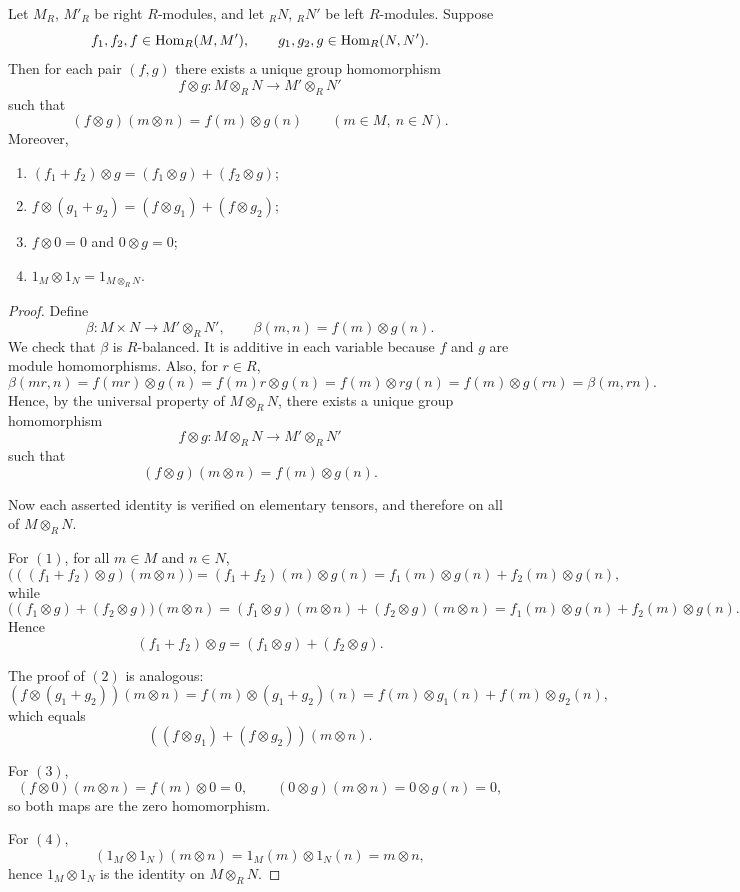 \begin{lemma}
    Let $M_R$, $M'_R$ be right $R$-modules, and let ${}_R N$, ${}_R N'$ be left $R$-modules. Suppose
    \[
        f_1,f_2,f\in \mathrm{Hom}_R(M,M'),
        \qquad
        g_1,g_2,g\in \mathrm{Hom}_R(N,N').
    \]
    Then for each pair $(f,g)$ there exists a unique group homomorphism
    \[
        f\otimes g:M\otimes_R N\to M'\otimes_R N'
    \]
    such that
    \[
        (f\otimes g)(m\otimes n)=f(m)\otimes g(n)
        \qquad
        (m\in M,\ n\in N).
    \]
    Moreover,
    \begin{enumerate}
        \item $(f_1+f_2)\otimes g=(f_1\otimes g)+(f_2\otimes g)$;
        \item $f\otimes (g_1+g_2)=(f\otimes g_1)+(f\otimes g_2)$;
        \item $f\otimes 0=0$ and $0\otimes g=0$;
        \item $1_M\otimes 1_N=1_{M\otimes_R N}$.
    \end{enumerate}
\end{lemma}

\begin{proof}
    Define
    \[
        \beta:M\times N\to M'\otimes_R N',
        \qquad
        \beta(m,n)=f(m)\otimes g(n).
    \]
    We check that $\beta$ is $R$-balanced. It is additive in each variable because $f$ and $g$ are module homomorphisms. Also, for $r\in R$,
    \[
        \beta(mr,n)=f(mr)\otimes g(n)=f(m)r\otimes g(n)
        =f(m)\otimes rg(n)=f(m)\otimes g(rn)=\beta(m,rn).
    \]
    Hence, by the universal property of $M\otimes_R N$, there exists a unique group homomorphism
    \[
        f\otimes g:M\otimes_R N\to M'\otimes_R N'
    \]
    such that
    \[
        (f\otimes g)(m\otimes n)=f(m)\otimes g(n).
    \]

    Now each asserted identity is verified on elementary tensors, and therefore on all of $M\otimes_R N$.

    For $(1)$, for all $m\in M$ and $n\in N$,
    \[
        \bigl(((f_1+f_2)\otimes g)(m\otimes n)\bigr)
        =(f_1+f_2)(m)\otimes g(n)
        =f_1(m)\otimes g(n)+f_2(m)\otimes g(n),
    \]
    while
    \[
        \bigl((f_1\otimes g)+(f_2\otimes g)\bigr)(m\otimes n)
        =(f_1\otimes g)(m\otimes n)+(f_2\otimes g)(m\otimes n)
        =f_1(m)\otimes g(n)+f_2(m)\otimes g(n).
    \]
    Hence
    \[
        (f_1+f_2)\otimes g=(f_1\otimes g)+(f_2\otimes g).
    \]

    The proof of $(2)$ is analogous:
    \[
        (f\otimes (g_1+g_2))(m\otimes n)
        =f(m)\otimes (g_1+g_2)(n)
        =f(m)\otimes g_1(n)+f(m)\otimes g_2(n),
    \]
    which equals
    \[
        ((f\otimes g_1)+(f\otimes g_2))(m\otimes n).
    \]

    For $(3)$,
    \[
        (f\otimes 0)(m\otimes n)=f(m)\otimes 0=0,
        \qquad
        (0\otimes g)(m\otimes n)=0\otimes g(n)=0,
    \]
    so both maps are the zero homomorphism.

    For $(4)$,
    \[
        (1_M\otimes 1_N)(m\otimes n)=1_M(m)\otimes 1_N(n)=m\otimes n,
    \]
    hence $1_M\otimes 1_N$ is the identity on $M\otimes_R N$.
\end{proof}

